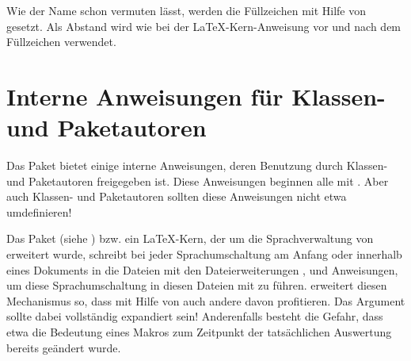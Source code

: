 Wie der Name schon vermuten lässt, werden die Füllzeichen mit Hilfe von
 gesetzt. Als Abstand wird wie bei der \LaTeX-Kern-Anweisung
 vor und nach dem Füllzeichen
 verwendet.%
\EndIndexGroup
%
\EndIndexGroup


\section{Interne Anweisungen für Klassen- und Paketautoren}

Das Paket  bietet einige interne Anweisungen, deren
Benutzung durch Klassen- und Paketautoren freigegeben ist. Diese Anweisungen
beginnen alle mit . Aber auch Klassen- und
Paketautoren sollten diese Anweisungen nicht
etwa umdefinieren!%


\begin{Declaration}
\end{Declaration}
Das Paket  (siehe \cite{package:babel})
bzw. ein \LaTeX-Kern, der um die Sprachverwaltung von 
erweitert wurde, schreibt bei jeder Sprachumschaltung am Anfang oder innerhalb
eines Dokuments in die Dateien mit den Dateierweiterungen ,
 und  Anweisungen, um diese Sprachumschaltung in diesen
Dateien mit zu führen.  erweitert diesen Mechanismus so,
dass mit Hilfe von  auch andere
 davon profitieren. Das Argument
 sollte dabei vollständig expandiert sein!
Anderenfalls besteht die Gefahr, dass etwa die Bedeutung eines Makros zum
Zeitpunkt der tatsächlichen Auswertung bereits geändert wurde.

